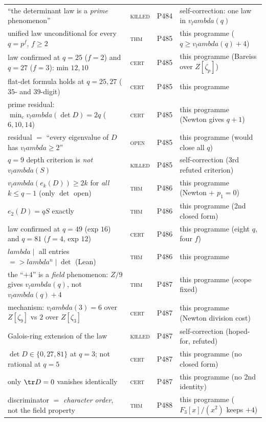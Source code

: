 \documentclass[12pt,a4paper]{article}
\def\mathbb#1{#1}%
\def\textbf#1{#1}%
\def\lambda{lambda}%
\def\Rightarrow{ => }%
\theoremstyle{definition}
\newcommand{\FF}{\mathbb{F}}
\newcommand{\ZZ}{\mathbb{Z}}
\begin{document}
\begin{center}
\begin{tabular}{@{}p{}llp{}@{}}
``the determinant law is a \emph{prime} phenomenon'' & \textsc{killed} & P484 & self-correction: one law in $v_\lambda(q)$ \\
unified law \textbf{unconditional} for every $q=p^f$, $f\ge2$ & \textsc{thm} & P485 & this programme ($q\ge v_\lambda(q){+}4$) \\
law confirmed at $q{=}25$ ($f{=}2$) and $q{=}27$ ($f{=}3$): min $12,10$ & \textsc{cert} & P485 & this programme (Bareiss over $\ZZ[\zeta_p]$) \\
flat-det formula holds at $q{=}25,27$ ($35$- and $39$-digit) & \textsc{cert} & P485 & this programme \\
prime residual: $\min_c v_\lambda(\det D)=2q$ ($6,10,14$) & \textsc{cert} & P485 & this programme (Newton gives $q{+}1$) \\
residual $=$ ``every eigenvalue of $D$ has $v_\lambda\ge2$'' & \textsc{open} & P485 & this programme (would close all $q$) \\
$q{=}9$ depth criterion is \emph{not} $v_\lambda(S)$ & \textsc{killed} & P485 & self-correction (3rd refuted criterion) \\
$v_\lambda(e_k(D))\ge2k$ for \emph{all} $k\le q{-}1$ (only $\det$ open) & \textsc{thm} & P486 & this programme (Newton $+$ $p_1{=}0$) \\
$e_2(D)=qS$ exactly & \textsc{thm} & P486 & this programme (2nd closed form) \\
law confirmed at $q{=}49$ (exp $16$) and $q{=}81$ ($f{=}4$, exp $12$) & \textsc{cert} & P486 & this programme (eight $q$, four $f$) \\
$\lambda\mid$ all entries $\Rightarrow\lambda^n\mid\det$ (Lean) & \textsc{thm} & P486 & this programme \\
the ``$+4$'' is a \emph{field} phenomenon: $\ZZ/9$ gives $v_\lambda(q)$, not $v_\lambda(q){+}4$ & \textsc{thm} & P487 & this programme (scope fixed) \\
mechanism: $v_\lambda(3)=6$ over $\ZZ[\zeta_9]$ vs $2$ over $\ZZ[\zeta_3]$ & \textsc{cert} & P487 & this programme (Newton division cost) \\
Galois-ring extension of the law & \textsc{killed} & P487 & self-correction (hoped-for, refuted) \\
$\det D\in\{0,27,81\}$ at $q{=}3$; not rational at $q{=}5$ & \textsc{cert} & P487 & this programme (no closed form) \\
only $\tr D=0$ vanishes identically & \textsc{cert} & P487 & this programme (no 2nd identity) \\
discriminator $=$ \emph{character order}, not the field property & \textsc{thm} & P488 & this programme ($\FF_3[x]/(x^2)$ keeps $+4$) \\

\end{tabular}
\end{center}
\end{document}
